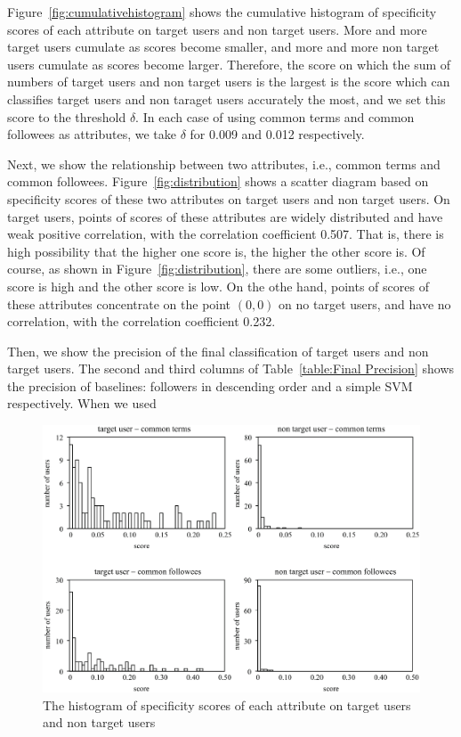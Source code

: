 Figure~\ref{fig:cumulativehistogram} shows the cumulative histogram of
specificity scores of each attribute on target users and non target
users.  More and more target users cumulate as scores become smaller,
and more and more non target users cumulate as scores become larger.
Therefore, the score on which the sum of numbers of target users and non
target users is the largest is the score which can classifies target
users and non taraget users accurately the most, and we set this score
to the threshold $\delta$.  In each case of using common terms and
common followees as attributes, we take $\delta$ for 0.009 and 0.012
respectively.

Next, we show the relationship between two attributes, i.e., common
terms and common followees.  Figure~\ref{fig:distribution} shows a
scatter diagram based on specificity scores of these two attributes on
target users and non target users.  On target users, points of scores of
these attributes are widely distributed and have weak positive
correlation, with the correlation coefficient 0.507.  That is, there is
high possibility that the higher one score is, the higher the other
score is.  Of course, as shown in Figure~\ref{fig:distribution}, there
are some outliers, i.e., one score is high and the other score is low.
On the othe hand, points of scores of these attributes concentrate on
the point $(0, 0)$ on no target users, and have no correlation, with the
correlation coefficient 0.232.

Then, we show the precision of the final classification of target users
and non target users.  The second and third columns of
Table~\ref{table:Final Precision} shows the precision of baselines:
followers in descending order and a simple SVM respectively.  When we
used





{\footnotesize
\begin{figure}[t]
\begin{center}
\includegraphics[width=14cm]{images/histogram.eps}
 \caption{The histogram of specificity scores of each attribute on
 target users and non target users}
\label{fig:histogram}
\end{center}
\end{figure}
}

